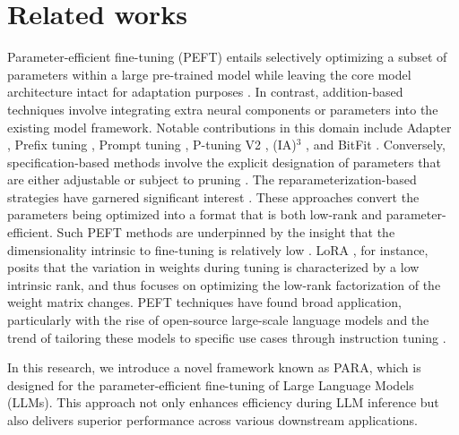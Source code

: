 \section{Related works}
Parameter-efficient fine-tuning (PEFT) entails selectively optimizing a subset of parameters within a large pre-trained model while leaving the core model architecture intact for adaptation purposes \cite{liu2024alora,tian2024fanlora,zheng2024sca,zhang2024milora,Ding2022DeltaTA,Zhang2023LearnedAA,zhu-tan-2023-spt,Cui2023UltraFeedbackBL,zheng2024nat4at,zhu2023acf,gao2023f,zuo-etal-2022-continually,zhang-etal-2022-pcee,sun-etal-2022-simple,zhu-etal-2021-gaml,Zhu2021MVPBERTMP,li-etal-2019-pingan,zhu2019panlp,zhu2019dr,zhou2019analysis}. In contrast, addition-based techniques involve integrating extra neural components or parameters into the existing model framework. Notable contributions in this domain include Adapter \cite{houlsby2019parameter,Rckl2020AdapterDropOT,Zhang2023LearnedAA}, Prefix tuning \cite{Li2021PrefixTuningOC}, Prompt tuning \cite{lester2021power}, P-tuning V2 \cite{Liu2022PTuningPT,zhu2024iapt}, (IA)$^{3}$ \cite{Liu2022FewShotPF}, and BitFit \cite{BenZaken2021BitFitSP}. Conversely, specification-based methods involve the explicit designation of parameters that are either adjustable or subject to pruning \cite{BenZaken2021BitFitSP,guo-etal-2021-parameter,zhao-etal-2020-masking,zheng2024chimera}. The reparameterization-based strategies have garnered significant interest \cite{hu2021lora}. These approaches convert the parameters being optimized into a format that is both low-rank and parameter-efficient. Such PEFT methods are underpinned by the insight that the dimensionality intrinsic to fine-tuning is relatively low \cite{aghajanyan-etal-2021-intrinsic}. LoRA \cite{hu2021lora}, for instance, posits that the variation in weights during tuning is characterized by a low intrinsic rank, and thus focuses on optimizing the low-rank factorization of the weight matrix changes. PEFT techniques have found broad application, particularly with the rise of open-source large-scale language models \cite{2023arXiv230318223Z} and the trend of tailoring these models to specific use cases through instruction tuning \cite{alpaca,2023arXiv230514314D}.


In this research, we introduce a novel framework known as PARA, which is designed for the parameter-efficient fine-tuning of Large Language Models (LLMs). This approach not only enhances efficiency during LLM inference but also delivers superior performance across various downstream applications.
